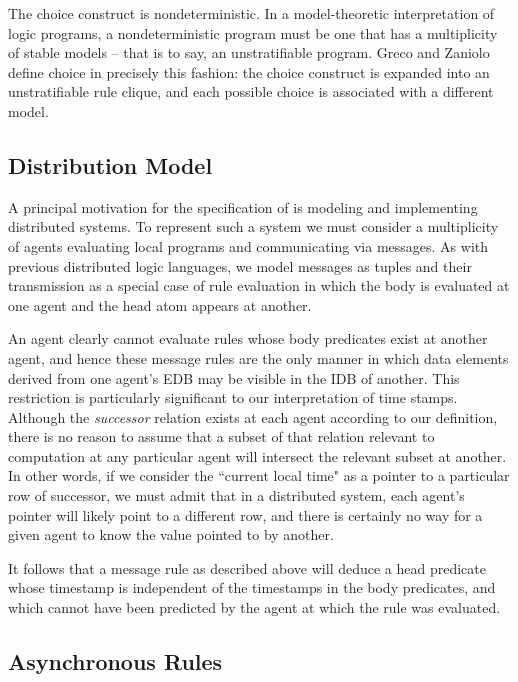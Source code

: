 The choice construct is nondeterministic.  In a model-theoretic interpretation of logic programs, a nondeterministic program 
must be one that has a multiplicity of stable models -- that is to say, an unstratifiable program.  Greco and Zaniolo define 
choice in precisely this fashion: the choice construct is expanded into an unstratifiable rule clique, 
and each possible choice is associated with a different model.



\subsection{Distribution Model}

A principal motivation for the specification of \lang is modeling and implementing distributed systems.
To represent such a system we must consider a multiplicity of agents evaluating local programs and
communicating via messages.  As with previous distributed logic languages, we model messages as
tuples and their transmission as a special case of rule evaluation in which the body is evaluated at one
agent and the head atom appears at another.  

An agent clearly cannot evaluate rules whose body
predicates exist at another agent, and hence these message rules are the only manner in which data
elements derived from one agent's EDB may be visible in the IDB of another.  This restriction is 
particularly significant to our interpretation of time stamps.  Although the \emph{successor} relation exists
at each agent according to our definition, there is no reason to assume that a subset of that relation 
relevant to computation at any particular agent will intersect the relevant subset at another.  In other words,
if we consider the ``current local time" as a pointer to a particular row of successor, we must admit that in a 
distributed system, each agent's pointer will likely point to a different row, and there is certainly no way for
a given agent to know the value pointed to by another.

It follows that a message rule as described above will deduce a head predicate whose timestamp is independent
of the timestamps in the body predicates, and which cannot have been predicted by the agent at which the rule
was evaluated.

\subsection{Asynchronous Rules}


